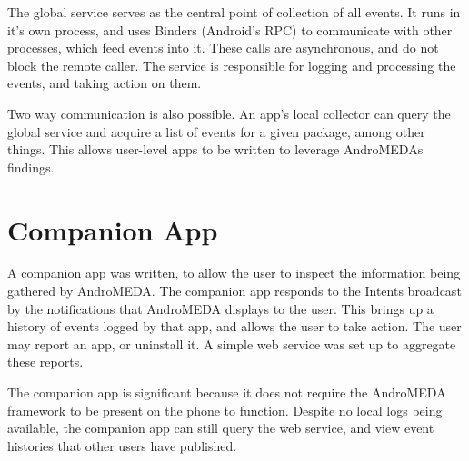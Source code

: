 The global service serves as the central point of collection of all events. It runs in it's own process, and uses Binders (Android's RPC) to communicate with other processes, which feed events into it. These calls are asynchronous, and do not block the remote caller. The service is responsible for logging and processing the events, and taking action on them.

Two way communication is also possible. An app's local collector can query the global service and acquire a list of events for a given package, among other things. This allows user-level apps to be written to leverage AndroMEDAs findings.

\section{Companion App}
A companion app was written, to allow the user to inspect the information being gathered by AndroMEDA. The companion app responds to the Intents broadcast by the notifications that AndroMEDA displays to the user. This brings up a history of events logged by that app, and allows the user to take action. The user may report an app, or uninstall it. A simple web service was set up to aggregate these reports.

The companion app is significant because it does not require the AndroMEDA framework to be present on the phone to function. Despite no local logs being available, the companion app can still query the web service, and view event histories that other users have published.
